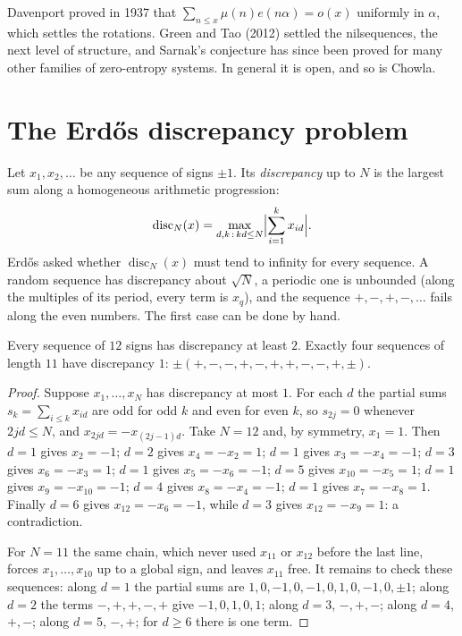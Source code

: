 \begin{remark}\label{rem:sarnakknown}
Davenport proved in 1937 that $\sum_{n\le x}\mu(n)e(n\alpha)=o(x)$ uniformly in $\alpha$, which settles the rotations. Green and Tao (2012) settled the
nilsequences, the next level of structure, and Sarnak's conjecture has since been proved for many other families of zero-entropy systems. In general it is open,
and so is Chowla.
\end{remark}

\section{The Erd\H os discrepancy problem}

Let $x_1,x_2,\dots$ be any sequence of signs $\pm1$. Its \emph{discrepancy} up to $N$ is the largest sum along a homogeneous arithmetic progression:
\[
\operatorname{disc}_N(x)=\max_{d,k\,:\,kd\le N}\Bigl|\sum_{i=1}^kx_{id}\Bigr|.
\]
Erd\H os asked whether $\operatorname{disc}_N(x)$ must tend to infinity for every sequence. A random sequence has discrepancy about $\sqrt N$, a periodic one
is unbounded (along the multiples of its period, every term is $x_q$), and the sequence $+,-,+,-,\dots$ fails along the even numbers. The first case can be
done by hand.

\begin{theorem}\label{thm:edp11}
Every sequence of $12$ signs has discrepancy at least $2$. Exactly four sequences of length $11$ have discrepancy $1$: $\pm(+,-,-,+,-,+,+,-,-,+,\pm)$.
\end{theorem}
\begin{proof}
Suppose $x_1,\dots,x_N$ has discrepancy at most $1$. For each $d$ the partial sums $s_k=\sum_{i\le k}x_{id}$ are odd for odd $k$ and even for even $k$, so
$s_{2j}=0$ whenever $2jd\le N$, and $x_{2jd}=-x_{(2j-1)d}$. Take $N=12$ and, by symmetry, $x_1=1$. Then $d=1$ gives $x_2=-1$; $d=2$ gives $x_4=-x_2=1$; $d=1$ gives
$x_3=-x_4=-1$; $d=3$ gives $x_6=-x_3=1$; $d=1$ gives $x_5=-x_6=-1$; $d=5$ gives $x_{10}=-x_5=1$; $d=1$ gives $x_9=-x_{10}=-1$; $d=4$ gives $x_8=-x_4=-1$; $d=1$ gives
$x_7=-x_8=1$. Finally $d=6$ gives $x_{12}=-x_6=-1$, while $d=3$ gives $x_{12}=-x_9=1$: a contradiction.

For $N=11$ the same chain, which never used $x_{11}$ or $x_{12}$ before the last line, forces $x_1,\dots,x_{10}$ up to a global sign, and leaves $x_{11}$ free.
It remains to check these sequences: along $d=1$ the partial sums are $1,0,-1,0,-1,0,1,0,-1,0,\pm1$; along $d=2$ the terms $-,+,+,-,+$ give $-1,0,1,0,1$;
along $d=3$, $-,+,-$; along $d=4$, $+,-$; along $d=5$, $-,+$; for $d\ge6$ there is one term.
\end{proof}

